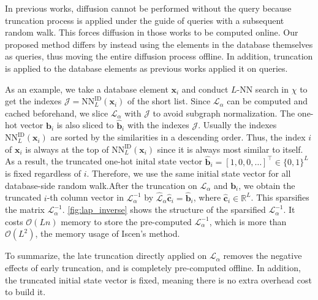 \documentclass[letterpaper]{article} \usepackage{aaai19}  \usepackage{times}  \usepackage{helvet}  \usepackage{courier}  \usepackage{url}  \usepackage{graphicx}  \frenchspacing  \setlength{\pdfpagewidth}{8.5in}  \setlength{\pdfpageheight}{11in}
\begin{document}
In previous works, diffusion cannot be performed without the query because truncation process is applied under the guide of queries with a subsequent random walk.
This forces diffusion in those works to be computed online.
Our proposed method differs by instead using the elements in the database themselves as queries, thus moving the entire diffusion process offline.
In addition, truncation is applied to the database elements as previous works applied it on queries.

As an example, we take a database element $\mathbf{x}_i$ and conduct $L$-NN search in $\chi$ to get the indexes $\mathcal{J}=\textrm{NN}_L^{\textrm{ID}}(\mathbf{x}_i)$ of the short list.
Since $\mathcal{L}_\alpha$ can be computed and cached beforehand, we slice $\mathcal{L}_\alpha$ with $\mathcal{J}$ to avoid subgraph normalization.
The one-hot vector $\mathbf{b}_i$ is also sliced to $\hat{\mathbf{b}}_i$ with the indexes $\mathcal{J}$.
Usually the indexes $\textrm{NN}^{\textrm{ID}}_L(\mathbf{x}_i)$ are sorted by the similarities in a descending order.
Thus, the index $i$ of $\mathbf{x}_i$ is always at the top of $\textrm{NN}^{\textrm{ID}}_L(\mathbf{x}_i)$ since it is always most similar to itself.
As a result, the truncated one-hot inital state vector $\hat{\mathbf{b}}_i=[1,0,0,\dots]^\top\in\{0,1\}^L$ is fixed regardless of $i$.
Therefore, we use the same initial state vector for all database-side random walk.After the truncation on $\mathcal{L}_\alpha$ and $\mathbf{b}_i$, we obtain the truncated $i$-th column vector in $\mathcal{L}_\alpha^{-1}$ by $\hat{\mathcal{L}}_\alpha \hat{\mathbf{c}}_i=\hat{\mathbf{b}}_i$, where $\hat{\mathbf{c}}_i\in\mathbb{R}^L$.
This sparsifies the matrix $\mathcal{L}_\alpha^{-1}$.
\cref{fig:lap_inverse} shows the structure of the sparsified $\mathcal{L}_\alpha^{-1}$.
It costs $\mathcal{O}(Ln)$ memory to store the pre-computed $\mathcal{L}_\alpha^{-1}$, which is more than $\mathcal{O}(L^2)$, the memory usage of Iscen's method.

To summarize, the late truncation directly applied on $\mathcal{L}_\alpha$ removes the negative effects of early truncation, and is completely pre-computed offline.
In addition, the truncated initial state vector is fixed, meaning there is no extra overhead cost to build it.
\end{document}
